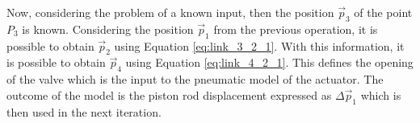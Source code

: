     Now, considering the problem of a known input, then the position $\vec{p}_3$ of the point $P_3$ is known. Considering the position $\vec{p}_1$ from the previous operation, it is possible to obtain $\vec{p}_2$ using Equation \ref{eq:link_3_2_1}. With this information, it is possible to obtain $\vec{p}_4$ using Equation \ref{eq:link_4_2_1}. This defines the opening of the valve which is the input to the pneumatic model of the actuator. The outcome of the model is the piston rod displacement expressed as $\Delta \vec{p}_1$ which is then used in the next iteration.
